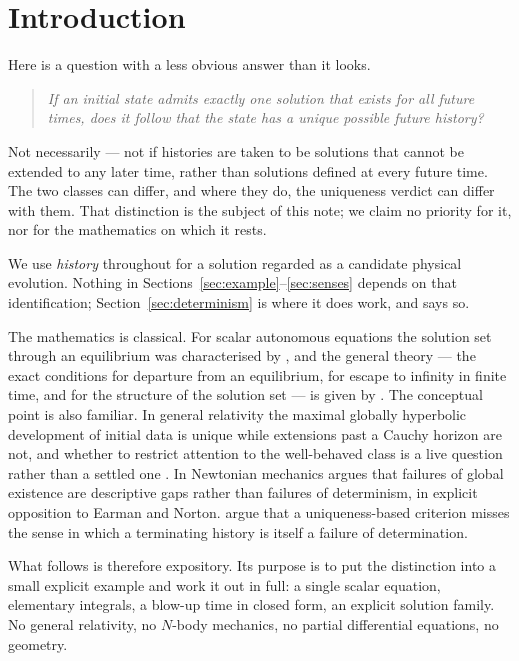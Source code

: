 \documentclass[12pt]{article}
\theoremstyle{plain}
\theoremstyle{definition}
\theoremstyle{remark}
\begin{document}
\section{Introduction}\label{sec:intro}

Here is a question with a less obvious answer than it looks.

\begin{quote}
\emph{If an initial state admits exactly one solution that exists for all future
times, does it follow that the state has a unique possible future history?}
\end{quote}

Not necessarily --- not if histories are taken to be solutions that cannot be
extended to any later time, rather than solutions defined at every future time. The
two classes can differ, and where they do, the uniqueness verdict can differ
with them. That distinction is the subject of this note; we claim no priority
for it, nor for the mathematics on which it rests.

We use \emph{history} throughout for a solution regarded as a candidate physical
evolution. Nothing in Sections~\ref{sec:example}--\ref{sec:senses} depends on
that identification; Section~\ref{sec:determinism} is where it does work, and
says so.

The mathematics is classical. For scalar autonomous equations the solution set
through an equilibrium was characterised by \citet{Wallach}, and
the general theory --- the exact conditions for departure from an equilibrium,
for escape to infinity in finite time, and for the structure of the solution set
--- is given by \citet{Binding}. The conceptual point is also familiar.
In general relativity the maximal globally hyperbolic development of initial
data is unique while extensions past a Cauchy horizon are not, and whether to
restrict attention to the well-behaved class is a live question rather than a
settled one \citep{Earman,SmeenkWuthrich}. In Newtonian mechanics \citet{Wilson} argues that failures of global existence are descriptive gaps
rather than failures of determinism, in explicit opposition to Earman and
Norton. \citet{AzharNamjoo} argue that a uniqueness-based
criterion misses the sense in which a terminating history is itself a failure of
determination.

What follows is therefore expository. Its purpose is to put the distinction into
a small explicit example and work it out in full: a single scalar equation,
elementary integrals, a blow-up time in closed form, an explicit solution
family. No general relativity, no $N$-body mechanics, no partial differential
equations, no geometry.
\end{document}
